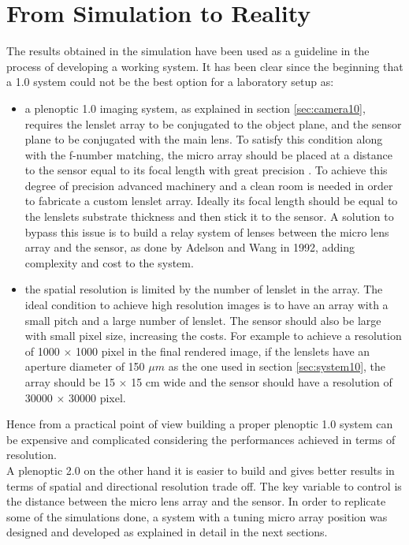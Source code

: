 \section{From Simulation to Reality}
The results obtained in the simulation have been used as a guideline in the process of developing a working system. It has been clear since the beginning that a 1.0 system could not be the best option for a laboratory setup as:
\begin{itemize}
	\item a plenoptic 1.0 imaging system, as explained in section \ref{sec:camera10}, requires the lenslet array to be conjugated to the object plane, and the sensor plane to be conjugated with the main lens. To satisfy this condition along with the f-number matching, the micro array should be placed at a distance to the sensor equal to its focal length with great precision \cite{ng2006digital,ng2005light,levoy1996light,levoy2006microscope}. To achieve this degree of precision advanced machinery and a clean room is needed in order to fabricate a custom lenslet array. Ideally its focal length should be equal to the lenslets substrate thickness and then stick it to the sensor. A solution to bypass this issue is to build a relay system of lenses between the micro lens array and the sensor, as done by Adelson and Wang in 1992, \cite{adelson1992single} adding complexity and cost to the system.
	\item the spatial resolution is limited by the number of lenslet in the array. The ideal condition to achieve high resolution images is to have an array with a small pitch and a large number of lenslet. The sensor should also be large with small pixel size, increasing the costs. For example to achieve a resolution of 1000 $\times$ 1000 pixel in the final rendered image, if the lenslets have an aperture diameter of 150 $\mu m$ as the one used in section \ref{sec:system10}, the array should be 15 $\times$ 15 cm wide and the sensor should have a resolution of 30000 $\times$ 30000 pixel.
\end{itemize}
Hence from a practical point of view building a proper plenoptic 1.0 system can be expensive and complicated considering the performances achieved in terms of resolution. \\
A plenoptic 2.0 on the other hand it is easier to build and gives better results in terms of spatial and directional resolution trade off. The key variable to control is the distance between the micro lens array and the sensor. In order to replicate some of the simulations done, a system with a tuning micro array position was designed and developed as explained in detail in the next sections.
